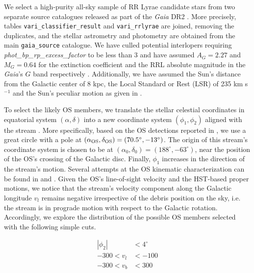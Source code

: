 \documentclass[a4paper,useAMS,usenatbib]{mnras}
\newcommand{\Gaia}{{\it Gaia}}
\newcommand{\gaia}{\textit{Gaia} }
\begin{document}
We select a high-purity all-sky sample of RR Lyrae candidate stars
from two separate source catalogues released as part of the \gaia DR2
\citep[][]{Prusti2016, Brown2018}. More precisely, tables
\texttt{vari\_classifier\_result} and \texttt{vari\_rrlyrae}
\citep[see][]{Clementini2018,Holl2018} are joined, removing the
duplicates, and the stellar astrometry and photometry are obtained
from the main \texttt{gaia\_source} catalogue. We have culled
potential interlopers requiring \textit{phot\_bp\_rp\_excess\_factor}
to be less than 3 and have assumed $A_G=2.27$ and $M_G=0.64$ for the
extinction coefficient and the RRL absolute magnitude in the \Gaia's
$G$ band respectively \citep[see][for further
  details]{Iorio2018}. Additionally, we have assumed the Sun's
distance from the Galactic center of 8 kpc, the Local Standard or Rest
(LSR) of 235 km s$^{-1}$ and the Sun's peculiar motion as given in
\citet{LSR}.

To select the likely OS members, we translate the stellar celestial
coordinates in equatorial system $(\alpha, \delta)$ into a new
coordinate system $(\phi_1, \phi_2)$ aligned with the stream
\citep[see e.g.][]{Koposov2010}. More specifically, based on the OS
detections reported in \citet{OS_V, OS_C, Newberg2010}, we use a great
circle with a pole at $(\alpha_{\rm OS}, \delta_{\rm
  OS})=(70.5^{\circ}, -13^{\circ})$. The origin of this stream's
coordinate system is chosen to be at $(\alpha_0,
\delta_0)=(188^{\circ}, -63^{\circ})$, near the position of the OS's
crossing of the Galactic disc. Finally, $\phi_1$ increases in the
direction of the stream's motion. Several attempts at the OS kinematic
characterization can be found in \citet{Newberg2010} and
\citet{Sohn2016}. Given the OS's line-of-sight velocity and the
HST-based proper motions, we notice that the stream's velocity
component along the Galactic longitude $v_l$ remains negative
irrespective of the debris position on the sky, i.e. the stream is in
prograde motion with respect to the Galactic rotation. Accordingly, we
explore the distribution of the possible OS members selected with the
following simple cuts.

%
\begin{equation}
  \begin{aligned}
    |\phi_2| &< 4^{\circ}\\
    -300<v_l &<-100\\
    -300<v_b &<300
  \end{aligned}
\end{equation}
%
\end{document}
